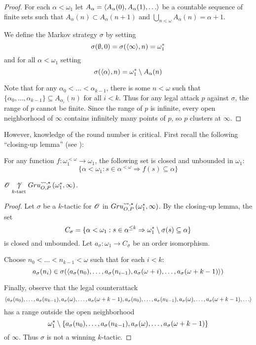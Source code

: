 \begin{proof}
  For each $\alpha<\omega_1$ let $A_\alpha=\<A_\alpha(0),A_\alpha(1),\dots\>$
  be a countable sequence of finite sets such that
  $A_\alpha(n)\subset A_\alpha(n+1)$ and
  $\bigcup_{n<\omega}A_\alpha(n)=\alpha+1$.

  We define the Markov strategy $\sigma$ by setting
    \[
      \sigma(\emptyset,0) = \sigma(\langle\infty\rangle,n) = \omega^*_1
    \]
  and for all $\alpha<\omega_1$ setting
    \[
      \sigma(\langle\alpha\rangle,n) = \omega^*_1 \setminus A_\alpha(n)
    \]

  Note that for any $\alpha_0<\dots<\alpha_{k-1}$, there is some $n<\omega$
  such that
  $\{\alpha_0,\dots,\alpha_{k-1}\}\subseteq A_{\alpha_i}(n)$ for all $i<k$.
  Thus for any legal attack $p$ against $\sigma$, the range of $p$ cannot
  be finite. Since the range of $p$ is infinite, every open neighborhood of
  $\infty$ contains infinitely many points of $p$, so $p$ clusters at $\infty$.
\end{proof}

However, knowledge of the round number is critical. First recall the
following ``closing-up lemma'' (see \cite{MR597342}):

\begin{lem}
  For any function $f:\omega_1^{<\omega}\to\omega_1$, the following set is closed
  and unbounded in $\omega_1$:
    \[
      \{
        \alpha<\omega_1
      :
        s\in\alpha^{<\omega} \Rightarrow f(s)\subseteq\alpha
      \}
    \]
\end{lem}

\begin{thm}
  $\mathscr{O}\underset{k\text{-tact}}{\not\uparrow}Gru_{O,P}^{\leadsto,\star}\left({\omega^*_1},{\infty}\right)$.
\end{thm}

\begin{proof}
  Let $\sigma$ be a $k$-tactic for $\mathscr{O}$ in
  $Gru_{O,P}^{\leadsto,\star}\left({\omega^*_1},{\infty}\right)$. By the closing-up lemma, the set
    \[
      C_\sigma
        =
      \{
        \alpha<\omega_1
          :
        s\in\alpha^{\leq k}
          \Rightarrow
        \omega^*_1\setminus\sigma(s)
        \subseteq \alpha
      \}
    \]
  is closed and unbounded. Let $a_\sigma:\omega_1\to C_\sigma$ be an order
  isomorphism.

  Choose $n_0<\dots<n_{k-1}<\omega$ such that for each $i<k$:
    \[
      a_\sigma(n_i)
        \in
      \sigma(
        \langle a_\sigma(n_0),\dots,a_\sigma(n_{i-1}),
          a_\sigma(\omega+i),\dots,a_\sigma(\omega+k-1)\rangle
      )
    \]

  Finally, observe that the legal counterattack
    \[
      \<a_\sigma(n_0),\dots,a_\sigma(n_{k-1}),
        a_\sigma(\omega),\dots,a_\sigma(\omega+k-1),
        a_\sigma(n_0),\dots,a_\sigma(n_{k-1}),
        a_\sigma(\omega),\dots,a_\sigma(\omega+k-1),
        \dots\>
    \]
  has a range outside the open neighborhood %
    \[
      \omega^*_1
        \setminus
      \{a_\sigma(n_0),\dots,a_\sigma(n_{k-1}),
        a_\sigma(\omega),\dots,a_\sigma(\omega+k-1)\}
    \]
  of $\infty$. Thus $\sigma$ is not a winning $k$-tactic.
\end{proof}

